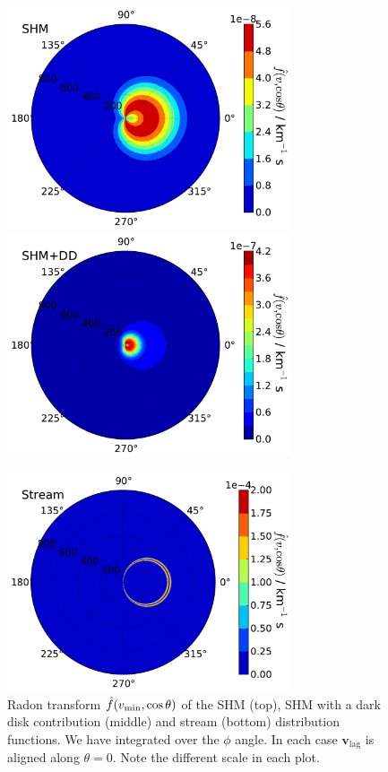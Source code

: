 \begin{figure}[pht!]
  \centering
  \includegraphics[width=0.75\textwidth]{Directional/SHMRadonpolar.pdf}
  \includegraphics[width=0.75\textwidth]{Directional/SHMDDRadonpolar.pdf}

  \includegraphics[width=0.75\textwidth]{Directional/STREAMRadonpolar.pdf}

\caption[Radon transform examples]{Radon transform $\hat{f}(\vmin, \cos\theta)$ of the SHM (top), SHM with a dark disk contribution (middle) and stream (bottom) distribution functions. We have integrated over the $\phi$ angle. In each case $\mathbf{v}_\textrm{lag}$ is aligned along $\theta = 0$. Note the different scale in each plot.}
  \label{fig:directional:Radon}
\end{figure}


